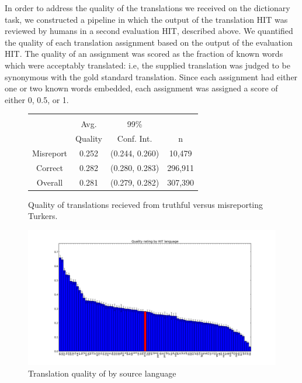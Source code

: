 \documentclass[11pt]{article}
\begin{document}
 
In order to address the quality of the translations we received on the dictionary task, we constructed a pipeline in which the output of the translation HIT was reviewed by humans in a second evaluation HIT, described above. We quantified the quality of each translation assignment based on the output of the evaluation HIT. The quality of an assignment was scored as the fraction of known words which were acceptably translated: i.e, the supplied translation was judged to be synonymous with the gold standard translation. Since each assignment had either one or two known words embedded, each assignment was assigned a score of either 0, 0.5, or 1.


\begin{figure}[h]
\centering
\begin{tabular}{cccc}\hline\hline\\
&Avg. & 99\%&\\
&Quality & Conf. Int.&n\\
Misreport&0.252&(0.244, 0.260)&10,479\\
Correct&0.282&(0.280, 0.283)&296,911\\
Overall&0.281&(0.279, 0.282)&307,390\\
\hline\hline
\end{tabular}
\label{mism-tab}
\caption{Quality of translations recieved from truthful versus misreporting Turkers.}
\end{figure}

\begin{figure}[h]
\centering
\includegraphics[width=6in]{figures/quality-hitlang}
\caption{Translation quality of by source language}
\label{hitlangqual-bar}
\end{figure}
\end{document}
